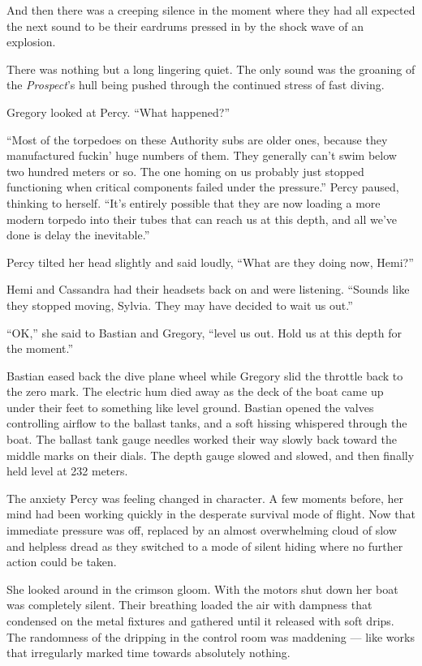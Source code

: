 \documentclass[
]{scrbook}
\begin{document}
And then there was a creeping silence in the moment where they had all
expected the next sound to be their eardrums pressed in by the shock
wave of an explosion.

There was nothing but a long lingering quiet. The only sound was the
groaning of the \emph{Prospect}'s hull being pushed through the
continued stress of fast diving.

Gregory looked at Percy. ``What happened?''

``Most of the torpedoes on these Authority subs are older ones, because
they manufactured fuckin' huge numbers of them. They generally can't
swim below two hundred meters or so. The one homing on us probably just
stopped functioning when critical components failed under the
pressure.'' Percy paused, thinking to herself. ``It's entirely possible
that they are now loading a more modern torpedo into their tubes that
can reach us at this depth, and all we've done is delay the
inevitable.''

Percy tilted her head slightly and said loudly, ``What are they doing
now, Hemi?''

Hemi and Cassandra had their headsets back on and were listening.
``Sounds like they stopped moving, Sylvia. They may have decided to wait
us out.''

``OK,'' she said to Bastian and Gregory, ``level us out. Hold us at this
depth for the moment.''

Bastian eased back the dive plane wheel while Gregory slid the throttle
back to the zero mark. The electric hum died away as the deck of the
boat came up under their feet to something like level ground. Bastian
opened the valves controlling airflow to the ballast tanks, and a soft
hissing whispered through the boat. The ballast tank gauge needles
worked their way slowly back toward the middle marks on their dials. The
depth gauge slowed and slowed, and then finally held level at 232
meters.

The anxiety Percy was feeling changed in character. A few moments
before, her mind had been working quickly in the desperate survival mode
of flight. Now that immediate pressure was off, replaced by an almost
overwhelming cloud of slow and helpless dread as they switched to a mode
of silent hiding where no further action could be taken.

She looked around in the crimson gloom. With the motors shut down her
boat was completely silent. Their breathing loaded the air with dampness
that condensed on the metal fixtures and gathered until it released with
soft drips. The randomness of the dripping in the control room was
maddening --- like works that irregularly marked time towards absolutely
nothing.
\end{document}
